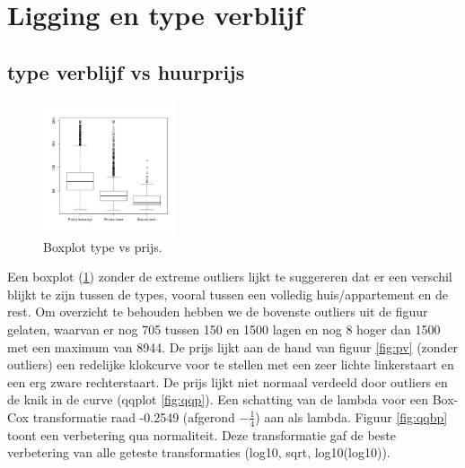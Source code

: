 \documentclass[a4paper,kulak]{kulakarticle} %
\begin{document}
\section{Ligging en type verblijf}
\subsection{type verblijf vs huurprijs} \label{sec:pt}
\begin{figure}
	\begin{center}
		\includegraphics[width=0.35\textwidth]{boxplotPrijsCity.jpg}
	\end{center}
	\caption{Boxplot type vs prijs.}
	\label{fig:bpc}
\end{figure}
Een boxplot (\ref{fig:bpc}) zonder de extreme outliers lijkt te suggereren  dat er een verschil blijkt te zijn tussen de types, vooral tussen een volledig huis/appartement en de rest.
Om overzicht te behouden hebben we de bovenste outliers uit de figuur gelaten, waarvan er nog 705 tussen 150 en 1500 lagen en nog 8 hoger dan 1500 met een maximum van 8944. 
De prijs lijkt aan de hand van figuur \ref{fig:pv} (zonder outliers) een redelijke klokcurve voor te stellen met een zeer lichte linkerstaart en een erg zware rechterstaart. 
De prijs lijkt niet normaal verdeeld door outliers en de knik in de curve (qqplot \ref*{fig:qqp}). 
Een schatting van de lambda voor een Box-Cox transformatie raad -0.2549 (afgerond $-\frac{1}{4}$) aan als lambda.
Figuur \ref{fig:qqbp} toont een verbetering qua normaliteit.
Deze transformatie gaf de beste verbetering van alle geteste transformaties (log10, sqrt, log10(log10)).\\
\end{document}
